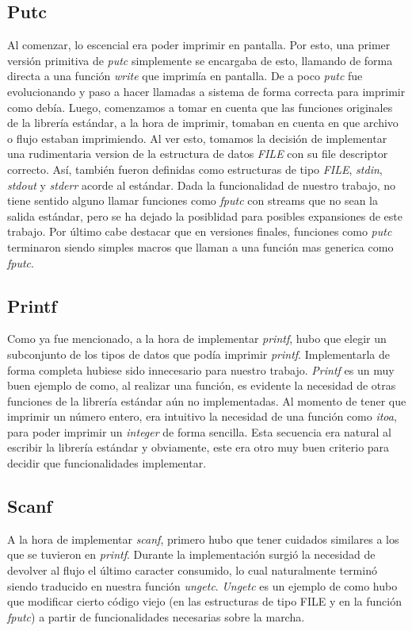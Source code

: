 \documentclass[a4paper,10pt]{article}
\begin{document}
    \subsection{Putc}
        Al comenzar, lo escencial era poder imprimir en pantalla. Por esto, una primer versión primitiva de \textit{putc} simplemente se encargaba de esto, llamando de forma directa a una función \textit{write} que imprimía en pantalla. De a poco \textit{putc} fue evolucionando y paso a hacer llamadas a sistema de forma correcta para imprimir como debía.
        Luego, comenzamos a tomar en cuenta que las funciones originales de la librería estándar, a la hora de imprimir, tomaban en cuenta en que archivo o flujo estaban imprimiendo. Al ver esto, tomamos la decisión de implementar una rudimentaria version de la estructura de datos \textit{FILE} con su file descriptor correcto. Así, también fueron definidas como estructuras de tipo \textit{FILE}, \textit{stdin}, \textit{stdout} y \textit{stderr} acorde al estándar. Dada la funcionalidad de nuestro trabajo, no tiene sentido alguno llamar funciones como \textit{fputc} con streams que no sean la salida estándar, pero se ha dejado la posiblidad para posibles expansiones de este trabajo.
        Por último cabe destacar que en versiones finales, funciones como \textit{putc} terminaron siendo simples macros que llaman a una función mas generica como \textit{fputc}.

    \subsection{Printf}
        Como ya fue mencionado, a la hora de implementar \textit{printf}, hubo que elegir un subconjunto de los tipos de datos que podía imprimir \textit{printf}. Implementarla de forma completa hubiese sido innecesario para nuestro trabajo. \textit{Printf} es un muy buen ejemplo de como, al realizar una función, es evidente la necesidad de otras funciones de la librería estándar aún no implementadas. Al momento de tener que imprimir un número entero, era intuitivo la necesidad de una función como \textit{itoa}, para poder imprimir un \textit{integer} de forma sencilla. Esta secuencia era natural al escribir la librería estándar y obviamente, este era otro muy buen criterio para decidir que funcionalidades implementar.

    \subsection{Scanf}    
        A la hora de implementar \textit{scanf}, primero hubo que tener cuidados similares a los que se tuvieron en \textit{printf}. Durante la implementación surgió la necesidad de devolver al flujo el último caracter consumido, lo cual naturalmente terminó siendo traducido en nuestra función \textit{ungetc}. \textit{Ungetc} es un ejemplo de como hubo que modificar cierto código viejo (en las estructuras de tipo FILE y en la función \textit{fputc}) a partir de funcionalidades necesarias sobre la marcha.
\newpage
\end{document}
